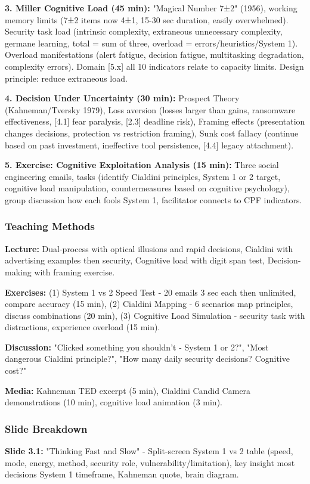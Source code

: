 \documentclass[11pt,a4paper]{article}
\begin{document}
\textbf{3. Miller Cognitive Load (45 min):} "Magical Number 7±2" (1956), working memory limits (7±2 items now 4±1, 15-30 sec duration, easily overwhelmed). Security task load (intrinsic complexity, extraneous unnecessary complexity, germane learning, total = sum of three, overload = errors/heuristics/System 1). Overload manifestations (alert fatigue, decision fatigue, multitasking degradation, complexity errors). Domain [5.x] all 10 indicators relate to capacity limits. Design principle: reduce extraneous load.

\textbf{4. Decision Under Uncertainty (30 min):} Prospect Theory (Kahneman/Tversky 1979), Loss aversion (losses larger than gains, ransomware effectiveness, [4.1] fear paralysis, [2.3] deadline risk), Framing effects (presentation changes decisions, protection vs restriction framing), Sunk cost fallacy (continue based on past investment, ineffective tool persistence, [4.4] legacy attachment).

\textbf{5. Exercise: Cognitive Exploitation Analysis (15 min):} Three social engineering emails, tasks (identify Cialdini principles, System 1 or 2 target, cognitive load manipulation, countermeasures based on cognitive psychology), group discussion how each fools System 1, facilitator connects to CPF indicators.

\subsubsection{Teaching Methods}
\textbf{Lecture:} Dual-process with optical illusions and rapid decisions, Cialdini with advertising examples then security, Cognitive load with digit span test, Decision-making with framing exercise.

\textbf{Exercises:} (1) System 1 vs 2 Speed Test - 20 emails 3 sec each then unlimited, compare accuracy (15 min), (2) Cialdini Mapping - 6 scenarios map principles, discuss combinations (20 min), (3) Cognitive Load Simulation - security task with distractions, experience overload (15 min).

\textbf{Discussion:} "Clicked something you shouldn't - System 1 or 2?", "Most dangerous Cialdini principle?", "How many daily security decisions? Cognitive cost?"

\textbf{Media:} Kahneman TED excerpt (5 min), Cialdini Candid Camera demonstrations (10 min), cognitive load animation (3 min).

\subsubsection{Slide Breakdown}
\textbf{Slide 3.1:} "Thinking Fast and Slow" - Split-screen System 1 vs 2 table (speed, mode, energy, method, security role, vulnerability/limitation), key insight most decisions System 1 timeframe, Kahneman quote, brain diagram.
\end{document}
